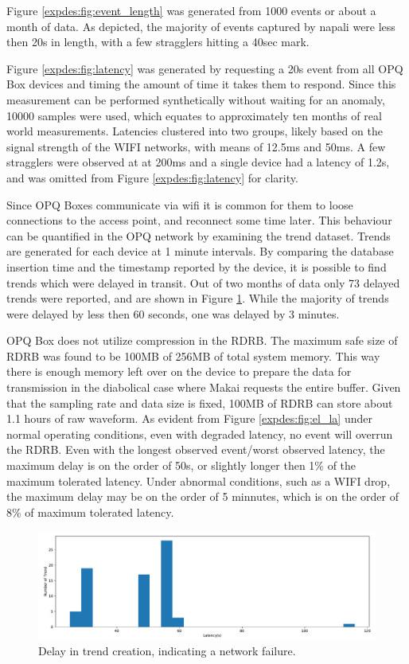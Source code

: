 Figure \ref{expdes:fig:event_length} was generated from 1000 events or about a month of data.
As depicted, the majority of events captured by napali were less then 20s in length, with a few stragglers hitting a 40sec mark.

Figure \ref{expdes:fig:latency} was generated by requesting a 20s event from all OPQ Box devices and timing the amount of time it takes them to respond.
Since this measurement can be performed synthetically without waiting for an anomaly, 10000 samples were used, which equates to approximately ten months of real world measurements.
Latencies clustered into two groups, likely based on the signal strength of the WIFI networks, with means of 12.5ms and 50ms.
A few stragglers were observed at at 200ms and a single device had a latency of 1.2s, and was omitted from Figure \ref{expdes:fig:latency} for clarity.

Since OPQ Boxes communicate via wifi it is common for them to loose connections to the access point, and reconnect some time later.
This behaviour can be quantified in the OPQ network by examining the trend dataset.
Trends are generated for each device at 1 minute intervals.
By comparing the database insertion time and the timestamp reported by the device, it is possible to find trends which were delayed in transit.
Out of two months of data only 73 delayed trends were reported, and are shown in Figure \ref{expdes:fig:trend_latency}.
While the majority of trends were delayed by less then 60 seconds, one was delayed by 3 minutes.

OPQ Box does not utilize compression in the RDRB.
The maximum safe size of RDRB was found to be 100MB of 256MB of total system memory.
This way there is enough memory left over on the device to prepare the data for transmission in the diabolical case where Makai requests the entire buffer.
Given that the sampling rate and data size is fixed, 100MB of RDRB can store about 1.1 hours of raw waveform.
As evident from Figure \ref{expdes:fig:el_la} under normal operating conditions, even with degraded latency, no event will overrun the RDRB.
Even with the longest observed event/worst observed latency, the maximum delay is on the order of 50s, or slightly longer then 1\% of the maximum tolerated latency.
Under abnormal conditions, such as a WIFI drop, the maximum delay may be on the order of 5 minnutes, which is on the order of 8\% of maximum tolerated latency.

\begin{figure}[h]
    \centering
    \includegraphics[width=1\linewidth]{img/napali_eval/trend_latency.pdf}
    \caption{Delay in trend creation, indicating a network failure.}
    \label{expdes:fig:trend_latency}
\end{figure}


